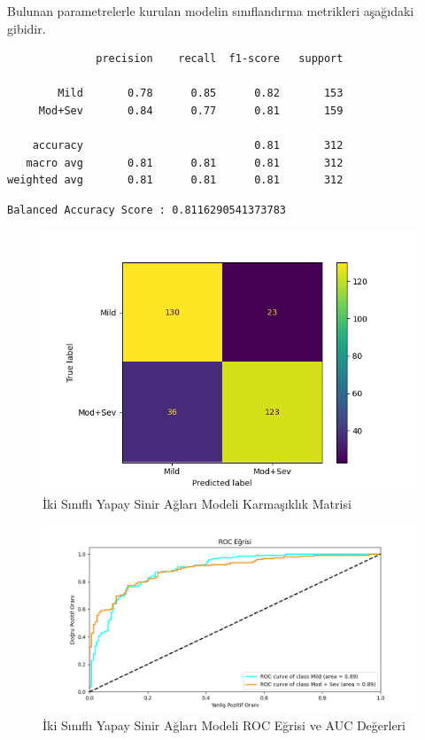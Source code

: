 \documentclass[12pt,twoside]{deuthesis}
\begin{document}
Bulunan parametrelerle kurulan modelin sınıflandırma metrikleri aşağıdaki gibidir.
\begin{verbatim}
              precision    recall  f1-score   support

        Mild       0.78      0.85      0.82       153
     Mod+Sev       0.84      0.77      0.81       159

    accuracy                           0.81       312
   macro avg       0.81      0.81      0.81       312
weighted avg       0.81      0.81      0.81       312
\end{verbatim}
\begin{verbatim}
Balanced Accuracy Score : 0.8116290541373783
\end{verbatim}
\begin{figure}

{\centering \includegraphics[width=1.05\linewidth,height=0.6\textheight]{figure/nn_bin_conf} 

}

\caption{İki Sınıflı Yapay Sinir Ağları Modeli Karmaşıklık Matrisi}\label{fig:unnamed-chunk-81}
\end{figure}
\begin{figure}

{\centering \includegraphics[width=1.05\linewidth,height=0.6\textheight]{figure/MLPClassifier_binary_roc} 

}

\caption{İki Sınıflı Yapay Sinir Ağları Modeli ROC Eğrisi ve AUC Değerleri}\label{fig:unnamed-chunk-82}
\end{figure}
\end{document}
